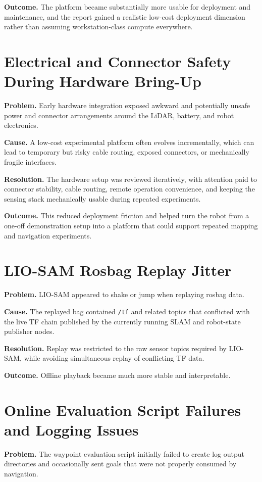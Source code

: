 \documentclass[12pt,a4paper]{report}
\begin{document}
\textbf{Outcome.} The platform became substantially more usable for deployment and maintenance, and the report gained a realistic low-cost deployment dimension rather than assuming workstation-class compute everywhere.

\section{Electrical and Connector Safety During Hardware Bring-Up}
\textbf{Problem.} Early hardware integration exposed awkward and potentially unsafe power and connector arrangements around the LiDAR, battery, and robot electronics.

\textbf{Cause.} A low-cost experimental platform often evolves incrementally, which can lead to temporary but risky cable routing, exposed connectors, or mechanically fragile interfaces.

\textbf{Resolution.} The hardware setup was reviewed iteratively, with attention paid to connector stability, cable routing, remote operation convenience, and keeping the sensing stack mechanically usable during repeated experiments.

\textbf{Outcome.} This reduced deployment friction and helped turn the robot from a one-off demonstration setup into a platform that could support repeated mapping and navigation experiments.

\section{LIO-SAM Rosbag Replay Jitter}
\textbf{Problem.} LIO-SAM appeared to shake or jump when replaying rosbag data.

\textbf{Cause.} The replayed bag contained \texttt{/tf} and related topics that conflicted with the live TF chain published by the currently running SLAM and robot-state publisher nodes.

\textbf{Resolution.} Replay was restricted to the raw sensor topics required by LIO-SAM, while avoiding simultaneous replay of conflicting TF data.

\textbf{Outcome.} Offline playback became much more stable and interpretable.

\section{Online Evaluation Script Failures and Logging Issues}
\textbf{Problem.} The waypoint evaluation script initially failed to create log output directories and occasionally sent goals that were not properly consumed by navigation.
\end{document}
